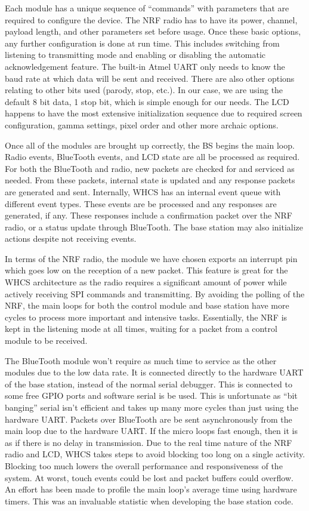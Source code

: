 Each module has a unique sequence of ``commands'' with parameters that are
required to configure the device. The NRF radio has to have its power, channel,
payload length, and other parameters set before usage. Once these basic
options, any further configuration is done at run time. This includes
switching from listening to transmitting mode and enabling or disabling the
automatic acknowledgement feature. The built-in Atmel UART only needs to know
the baud rate at which data will be sent and received. There are also other
options relating to other bits used (parody, stop, etc.). In our case, we are
using the default 8 bit data, 1 stop bit, which is simple enough for our needs.
The LCD happens to have the most extensive initialization sequence due to
required screen configuration, gamma settings, pixel order and other more
archaic options.

Once all of the modules are brought up correctly, the BS begins the main loop.
Radio events, BlueTooth events, and LCD state are all be processed as
required. For both the BlueTooth and radio, new packets are checked for
and serviced as needed. From these packets, internal state is updated and any
response packets are generated and sent. Internally, WHCS has an
internal event queue with different event types. These events are be processed
and any responses are generated, if any. These responses include a
confirmation packet over the NRF radio, or a status update through BlueTooth.
The base station may also initialize actions despite not receiving events.

In terms of the NRF radio, the module we have chosen exports an interrupt pin
which goes low on the reception of a new packet. This feature is great for the
WHCS architecture as the radio requires a significant amount of power
while actively receiving SPI commands and transmitting. By avoiding the polling
of the NRF, the main loops for both the control module and base station
have more cycles to process more important and intensive tasks. Essentially,
the NRF is kept in the listening mode at all times, waiting for a packet
from a control module to be received.

The BlueTooth module won't require as much time to service as the other modules
due to the low data rate. It is connected directly to the hardware UART of
the base station, instead of the normal serial debugger. This is
connected to some free GPIO ports and software serial is be used. This is
unfortunate as ``bit banging'' serial isn't efficient and takes up many
more cycles than just using the hardware UART. Packets over
BlueTooth are be sent asynchronously from the main loop due to the hardware
UART. If the micro loops fast enough, then it is as if there is no delay
in transmission. Due to the real time nature of the NRF radio and LCD, WHCS
takes steps to avoid blocking too long on a single activity. Blocking too
much lowers the overall performance and responsiveness of the system. At
worst, touch events could be lost and packet buffers could overflow. An effort
has been made to profile the main loop's average time using hardware timers.
This was an invaluable statistic when developing the base station code.

